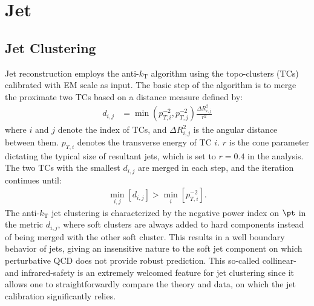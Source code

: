 \clearpage
\section{Jet} \label{sec::objDef::jets}
%
\subsection{Jet Clustering} \label{sec::objDef::jets::clustering}
Jet reconstruction employs the anti-$k_{\mathrm{T}}$ algorithm \cite{141_antiKt} using the topo-clusters (TCs) calibrated with EM scale as input.
The basic step of the algorithm is to merge the proximate two TCs based on a distance measure defined by:
\begin{align}
d_{i,j} & = \min(p_{T,i}^{-2},p_{T,j}^{-2}) \frac{\Delta R^2_{i,j}}{r^2} 
\end{align}
where $i$ and $j$ denote the index of TCs, and $\Delta R^2_{i,j}$ is the angular distance between them. $p_{T,i}$ denotes the transverse energy of TC $i$.
$r$ is the cone parameter dictating the typical size of resultant jets, which is set to $r=0.4$ in the analysis.
The two TCs with the smallest $d_{i,j}$ are merged in each step, and the iteration continues until:
\begin{align}
\min_{i,j} \left[ d_{i,j} \right] > \min_{i} \left[ p_{T,i}^{-2} \right].
\end{align}
The anti-$k_{\mathrm{T}}$ jet clustering is characterized by the negative power index on $\pt$ in the metric $d_{i,j}$, 
where soft clusters are always added to hard components instead of being merged with the other soft cluster.
This results in a well boundary behavior of jets, giving an insensitive nature to the soft jet component on which perturbative QCD does not provide robust prediction. 
This so-called collinear- and infrared-safety is an extremely welcomed feature for jet clustering
since it allows one to straightforwardly compare the theory and data,
on which the jet calibration significantly relies.
%




